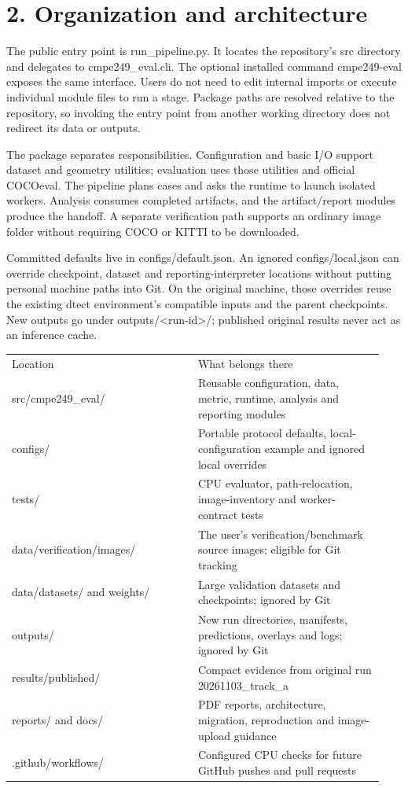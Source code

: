 \documentclass[10pt]{article}
\begin{document}
\section*{2. Organization and architecture}
The public entry point is run\_pipeline.py. It locates the repository's src directory and delegates to cmpe249\_eval.cli. The optional installed command cmpe249-eval exposes the same interface. Users do not need to edit internal imports or execute individual module files to run a stage. Package paths are resolved relative to the repository, so invoking the entry point from another working directory does not redirect its data or outputs.


The package separates responsibilities. Configuration and basic I/O support dataset and geometry utilities; evaluation uses those utilities and official COCOeval. The pipeline plans cases and asks the runtime to launch isolated workers. Analysis consumes completed artifacts, and the artifact/report modules produce the handoff. A separate verification path supports an ordinary image folder without requiring COCO or KITTI to be downloaded.


Committed defaults live in configs/default.json. An ignored configs/local.json can override checkpoint, dataset and reporting-interpreter locations without putting personal machine paths into Git. On the original machine, those overrides reuse the existing dtect environment's compatible inputs and the parent checkpoints. New outputs go under outputs/<run-id>/; published original results never act as an inference cache.


\begin{longtable}{p{0.470\linewidth}p{0.470\linewidth}}
Location & What belongs there \\
src/cmpe249\_eval/ & Reusable configuration, data, metric, runtime, analysis and reporting modules \\
configs/ & Portable protocol defaults, local-configuration example and ignored local overrides \\
tests/ & CPU evaluator, path-relocation, image-inventory and worker-contract tests \\
data/verification/images/ & The user's verification/benchmark source images; eligible for Git tracking \\
data/datasets/ and weights/ & Large validation datasets and checkpoints; ignored by Git \\
outputs/ & New run directories, manifests, predictions, overlays and logs; ignored by Git \\
results/published/ & Compact evidence from original run 20261103\_track\_a \\
reports/ and docs/ & PDF reports, architecture, migration, reproduction and image-upload guidance \\
.github/workflows/ & Configured CPU checks for future GitHub pushes and pull requests \\
\end{longtable}
\clearpage
\end{document}
